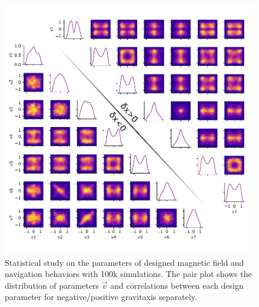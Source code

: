  
 \begin{figure}[p]
\centering
\includegraphics[width=16cm]{figures/5_4.pdf}
\caption{ Statistical study on the parameters of designed magnetic field and navigation behaviors with 100k simulations. The pair plot shows the distribution of parameters $\vec{v}$ and correlations between each design parameter for negative/positive gravitaxis separately.}
\label{fig:1}
\end{figure}
 
 
 
